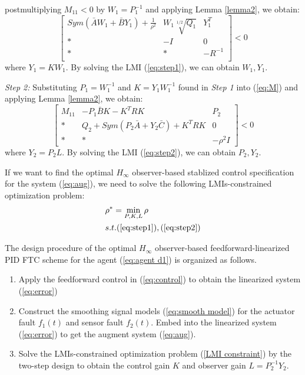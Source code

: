 \documentclass{ieeeaccess}
\begin{document}
postmultiplying $M_{11}<0$ by $W_1=P_1^{-1}$ and applying Lemma \ref{lemma2}, we obtain:
\begin{equation} \label{eq:step1}
    \begin{bmatrix}
        Sym(\bar{A}W_1+\bar{B}Y_1) + \frac{1}{\rho^2} & W_1\sqrt[1/2]{Q_1} & Y_1^T \\
        * & -I & 0\\
        * & * & -R^{-1}\\
    \end{bmatrix} < 0
\end{equation}
where $Y_1=KW_1$. By solving the LMI (\ref{eq:step1}), we can obtain $W_1,Y_1$.

\textit{Step 2:} Substituting $P_1=W_1^{-1}$ and $K=Y_1W_1^{-1}$ found in \textit{Step 1} into (\ref{eq:M}) and applying Lemma \ref{lemma2}, we obtain:
\begin{equation} \label{eq:step2}
    \begin{bmatrix}
        M_{11} & -P_1\bar{B}K - K^TRK & P_2 \\
        * & Q_2+Sym(P_2\bar{A}+Y_2\bar{C}) + K^TRK & 0 \\
        * & * & -\rho^2I
    \end{bmatrix} < 0
\end{equation}
where $Y_2=P_2L$. By solving the LMI (\ref{eq:step2}), we can obtain $P_2,Y_2$.


If we want to find the optimal $H_\infty$ observer-based stablized control specification for the system (\ref{eq:aug}), we need to solve the following LMIs-constrained optimization problem:
\begin{equation} \label{LMI constraint}
    \begin{split}
        & \rho^*=\mathop{\min}_{P,K,L} \rho \\
        & s.t. (\refeq{eq:step1}),(\refeq{eq:step2}) 
    \end{split}
\end{equation}

The design procedure of the optimal $H_\infty$ observer-based feedforward-linearized PID FTC scheme for the agent (\ref{eq:agent d1}) is organized as follows.
\begin{enumerate}
    \item Apply the feedforward control in (\ref{eq:control}) to obtain the linearized system (\ref{eq:error})
    \item Construct the smoothing signal models (\ref{eq:smooth model}) for the actuator fault $f_1(t)$ and sensor fault $f_2(t)$. Embed into the linearized system (\ref{eq:error}) to get the augment system (\ref{eq:aug}).
    \item Solve the LMIs-constrained optimization problem (\ref{LMI constraint}) by the two-step design to obtain the control gain $K$ and observer gain $L=P_2^{-1}Y_2$.
\end{enumerate}
\end{document}
